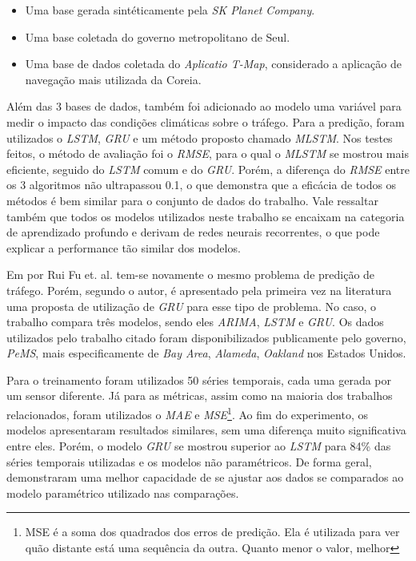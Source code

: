 \begin{itemize}
    \item Uma base gerada sintéticamente pela \textit{SK Planet Company}.
    \item Uma base coletada do governo metropolitano de Seul.
    \item Uma base de dados coletada do \textit{Aplicatio T-Map}, considerado a aplicação de navegação mais utilizada da Coreia.
\end{itemize} 

Além das 3 bases de dados, também foi adicionado ao modelo uma variável para medir o impacto das condições climáticas sobre o tráfego.
Para a predição, foram utilizados o \textit{\acrshort{LSTM}}, \textit{\acrshort{GRU}} e um método proposto chamado \textit{\acrfull{MLSTM}}. Nos testes feitos, o método de avaliação foi o \textit{\acrshort{RMSE}}, para o qual o \textit{\acrshort{MLSTM}} se mostrou mais eficiente, seguido do \textit{\acrshort{LSTM}} comum e do \textit{\acrshort{GRU}}. Porém, a diferença do \textit{\acrshort{RMSE}} entre os 3 algoritmos não ultrapassou 0.1, o que demonstra que a eficácia de todos os métodos é bem similar para o conjunto de dados do trabalho. Vale ressaltar também que todos os modelos utilizados neste trabalho se encaixam na categoria de aprendizado profundo e derivam de redes neurais recorrentes, o que pode explicar a performance tão similar dos modelos.

Em  \cite{fu2016using} por Rui Fu et. al. tem-se novamente o mesmo problema de predição de tráfego. Porém, segundo o autor, é apresentado pela primeira vez na literatura uma proposta de utilização de \textit{\acrshort{GRU}} para esse tipo de problema. No caso, o trabalho compara três modelos, sendo eles \textit{\acrshort{ARIMA}}, \textit{\acrshort{LSTM}} e \textit{\acrshort{GRU}}. Os dados utilizados pelo trabalho citado foram disponibilizados publicamente pelo governo, \textit{PeMS}, mais especificamente de \textit{Bay Area}, \textit{Alameda}, \textit{Oakland} nos Estados Unidos. 

Para o treinamento foram utilizados 50 séries temporais, cada uma gerada por um sensor diferente. Já para as métricas, assim como na maioria dos trabalhos relacionados, foram utilizados o \textit{\acrshort{MAE}} e \textit{\acrfull{MSE}}\footnote{MSE é a soma dos quadrados dos erros de predição. Ela é utilizada para ver quão distante está uma sequência da outra. Quanto menor o valor, melhor}. Ao fim do experimento, os modelos apresentaram resultados similares, sem uma diferença muito significativa entre eles. Porém, o modelo \textit{\acrshort{GRU}} se mostrou superior ao \textit{\acrshort{LSTM}} para 84\% das séries temporais utilizadas e os modelos não paramétricos. De forma geral, demonstraram uma melhor capacidade de se ajustar aos dados se comparados ao modelo paramétrico utilizado nas comparações.

